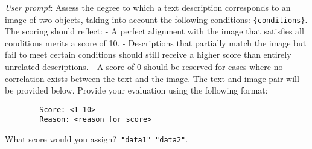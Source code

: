 \begin{tcolorbox}[enhanced,attach boxed title to top center={yshift=-3mm,yshifttext=-1mm},
  colback=green!5!white,colframe=green!20!gray,colbacktitle=green!20!gray,
  title=Image-Text Prompt Template V5,fonttitle=\bfseries,
  boxed title style={size=small,colframe=green!20!gray} ]

        \emph{User prompt}: Assess the degree to which a text description corresponds to an image of two objects, taking into account the following conditions: \texttt{\{conditions\}}. The scoring should reflect:
        - A perfect alignment with the image that satisfies all conditions merits a score of 10.
        - Descriptions that partially match the image but fail to meet certain conditions should still receive a higher score than entirely unrelated descriptions.
        - A score of 0 should be reserved for cases where no correlation exists between the text and the image.
        The text and image pair will be provided below. Provide your evaluation using the following format:
        
        \begin{verbatim}
        Score: <1-10>
        Reason: <reason for score>
        \end{verbatim}
        
        What score would you assign?\
        \texttt{"data1"}\
        \texttt{"data2"}.\
        
\end{tcolorbox}
